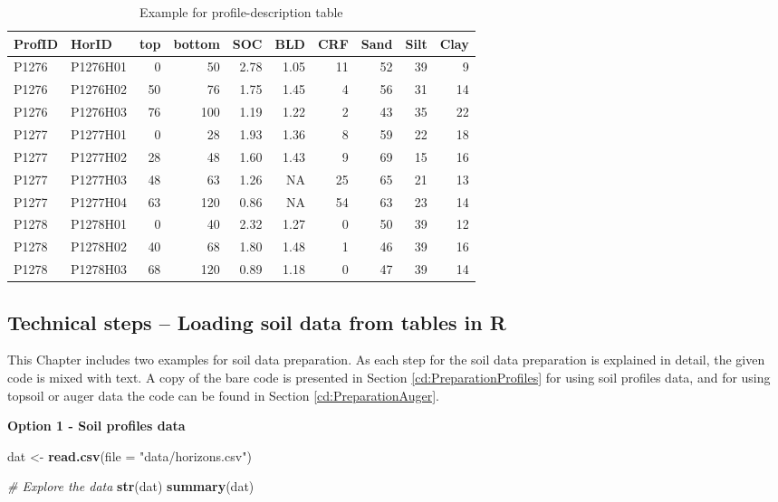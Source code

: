 \documentclass[10pt,b5paper,]{book}
\newenvironment{Shaded}{\begin{snugshade}}{\end{snugshade}}
\newcommand{\CommentTok}[1]{\textcolor[rgb]{0.56,0.35,0.01}{\textit{#1}}}
\newcommand{\DataTypeTok}[1]{\textcolor[rgb]{0.13,0.29,0.53}{#1}}
\newcommand{\KeywordTok}[1]{\textcolor[rgb]{0.13,0.29,0.53}{\textbf{#1}}}
\newcommand{\NormalTok}[1]{#1}
\newcommand{\StringTok}[1]{\textcolor[rgb]{0.31,0.60,0.02}{#1}}
\theoremstyle{definition}
\theoremstyle{definition}
\theoremstyle{definition}
\theoremstyle{remark}
\begin{document}
\begin{table}

\caption{\label{tab:horizon-level}Example for profile-description table}
\centering
\begin{tabular}[t]{llrrrrrrrr}
\toprule
ProfID & HorID & top & bottom & SOC & BLD & CRF & Sand & Silt & Clay\\
\midrule
P1276 & P1276H01 & 0 & 50 & 2.78 & 1.05 & 11 & 52 & 39 & 9\\
P1276 & P1276H02 & 50 & 76 & 1.75 & 1.45 & 4 & 56 & 31 & 14\\
P1276 & P1276H03 & 76 & 100 & 1.19 & 1.22 & 2 & 43 & 35 & 22\\
P1277 & P1277H01 & 0 & 28 & 1.93 & 1.36 & 8 & 59 & 22 & 18\\
P1277 & P1277H02 & 28 & 48 & 1.60 & 1.43 & 9 & 69 & 15 & 16\\
\addlinespace
P1277 & P1277H03 & 48 & 63 & 1.26 & NA & 25 & 65 & 21 & 13\\
P1277 & P1277H04 & 63 & 120 & 0.86 & NA & 54 & 63 & 23 & 14\\
P1278 & P1278H01 & 0 & 40 & 2.32 & 1.27 & 0 & 50 & 39 & 12\\
P1278 & P1278H02 & 40 & 68 & 1.80 & 1.48 & 1 & 46 & 39 & 16\\
P1278 & P1278H03 & 68 & 120 & 0.89 & 1.18 & 0 & 47 & 39 & 14\\
\bottomrule
\end{tabular}
\end{table}

\hypertarget{technical-steps-loading-soil-data-from-tables-in-r}{%
\subsection{Technical steps -- Loading soil data from tables in
R}\label{technical-steps-loading-soil-data-from-tables-in-r}}

This Chapter includes two examples for soil data preparation. As each
step for the soil data preparation is explained in detail, the given
code is mixed with text. A copy of the bare code is presented in Section
\ref{cd:PreparationProfiles} for using soil profiles data, and for using
topsoil or auger data the code can be found in Section
\ref{cd:PreparationAuger}.

\textbf{Option 1 - Soil profiles data}

\begin{Shaded}
\begin{Highlighting}[]
\NormalTok{dat <-}\StringTok{ }\KeywordTok{read.csv}\NormalTok{(}\DataTypeTok{file =} \StringTok{"data/horizons.csv"}\NormalTok{)}

\CommentTok{# Explore the data}
\KeywordTok{str}\NormalTok{(dat)}
\KeywordTok{summary}\NormalTok{(dat)}
\end{Highlighting}
\end{Shaded}
\end{document}
